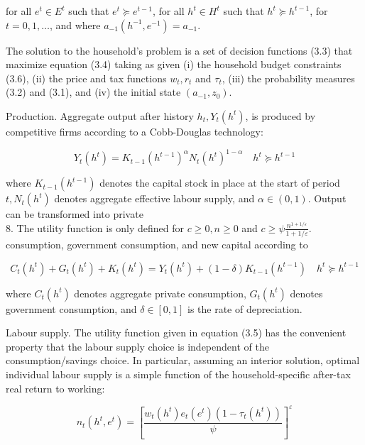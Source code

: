 \documentclass[11pt]{article}
\begin{document}
for all $e^{t} \in E^{t}$ such that $e^{t} \succeq e^{t-1}$, for all $h^{t} \in H^{t}$ such that $h^{t} \succeq h^{t-1}$, for $t=0,1, \ldots$, and where $a_{-1}\left(h^{-1}, e^{-1}\right)=a_{-1}$.

The solution to the household's problem is a set of decision functions (3.3) that maximize equation (3.4) taking as given (i) the household budget constraints (3.6), (ii) the price and tax functions $w_{t}, r_{t}$ and $\tau_{t}$, (iii) the probability measures (3.2) and (3.1), and (iv) the initial state $\left(a_{-1}, z_{0}\right)$.

Production. Aggregate output after history $h_{t}, Y_{t}\left(h^{t}\right)$, is produced by competitive firms according to a Cobb-Douglas technology:

$$
Y_{t}\left(h^{t}\right)=K_{t-1}\left(h^{t-1}\right)^{\alpha} N_{t}\left(h^{t}\right)^{1-\alpha} \quad h^{t} \succeq h^{t-1}
$$

where $K_{t-1}\left(h^{t-1}\right)$ denotes the capital stock in place at the start of period $t, N_{t}\left(h^{t}\right)$ denotes aggregate effective labour supply, and $\alpha \in(0,1)$. Output can be transformed into private\\
8. The utility function is only defined for $c \geq 0, n \geq 0$ and $c \geq \psi \frac{n^{1+1 / \varepsilon}}{1+1 / \varepsilon}$.\\
consumption, government consumption, and new capital according to


\begin{equation*}
C_{t}\left(h^{t}\right)+G_{t}\left(h^{t}\right)+K_{t}\left(h^{t}\right)=Y_{t}\left(h^{t}\right)+(1-\delta) K_{t-1}\left(h^{t-1}\right) \quad h^{t} \succeq h^{t-1} \tag{3.7}
\end{equation*}


where $C_{t}\left(h^{t}\right)$ denotes aggregate private consumption, $G_{t}\left(h^{t}\right)$ denotes government consumption, and $\delta \in[0,1]$ is the rate of depreciation.

Labour supply. The utility function given in equation (3.5) has the convenient property that the labour supply choice is independent of the consumption/savings choice. In particular, assuming an interior solution, optimal individual labour supply is a simple function of the household-specific after-tax real return to working:


\begin{equation*}
n_{t}\left(h^{t}, e^{t}\right)=\left[\frac{w_{t}\left(h^{t}\right) e_{t}\left(e^{t}\right)\left(1-\tau_{t}\left(h^{t}\right)\right)}{\psi}\right]^{\varepsilon} \tag{3.8}
\end{equation*}
\end{document}
